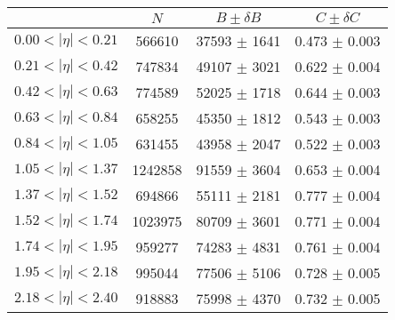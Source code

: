 \begin{tabular}{lccc}
\hline
    &   $N$   & $B \pm \delta B$  &  $C \pm \delta C$ \\
\hline
$0.00 < |\eta| <0.21$          & 566610     & 37593      $\pm$ 1641 & 0.473      $\pm$ 0.003 \\
$0.21 < |\eta| <0.42$          & 747834     & 49107      $\pm$ 3021 & 0.622      $\pm$ 0.004 \\
$0.42 < |\eta| <0.63$          & 774589     & 52025      $\pm$ 1718 & 0.644      $\pm$ 0.003 \\
$0.63 < |\eta| <0.84$          & 658255     & 45350      $\pm$ 1812 & 0.543      $\pm$ 0.003 \\
$0.84 < |\eta| <1.05$          & 631455     & 43958      $\pm$ 2047 & 0.522      $\pm$ 0.003 \\
$1.05 < |\eta| <1.37$          & 1242858    & 91559      $\pm$ 3604 & 0.653      $\pm$ 0.004 \\
$1.37 < |\eta| <1.52$          & 694866     & 55111      $\pm$ 2181 & 0.777      $\pm$ 0.004 \\
$1.52 < |\eta| <1.74$          & 1023975    & 80709      $\pm$ 3601 & 0.771      $\pm$ 0.004 \\
$1.74 < |\eta| <1.95$          & 959277     & 74283      $\pm$ 4831 & 0.761      $\pm$ 0.004 \\
$1.95 < |\eta| <2.18$          & 995044     & 77506      $\pm$ 5106 & 0.728      $\pm$ 0.005 \\
$2.18 < |\eta| <2.40$          & 918883     & 75998      $\pm$ 4370 & 0.732      $\pm$ 0.005 \\
\hline
\end{tabular}
